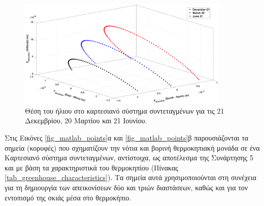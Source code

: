 \documentclass[12pt, a4paper]{report} %
\begin{document}
\begin{figure}[ht]%
    \centering
    \includegraphics[width=0.9\textwidth]{Figures/sun_pos.jpg}
    \caption{Θέση του ήλιου στο καρτεσιανό σύστημα συντεταγμένων για τις 21 Δεκεμβρίου, 20 Μαρτίου και 21 Ιουνίου.}
    \label{fig_sun_pos}
\end{figure}

Στις Εικόνες \ref{fig_matlab_points}α και \ref{fig_matlab_points}β παρουσιάζονται τα σημεία (κορυφές) που σχηματίζουν την νότια 
και βορινή θερμοκηπιακή μονάδα σε ένα Καρτεσιανό σύστημα συντεταγμένων, αντίστοιχα, ως αποτέλεσμα της Συνάρτησης 5 και με βάση 
τα χαρακτηριστικά του θερμοκηπίου (Πίνακας \ref{tab_greenhouse_characteristics}). Τα σημεία αυτά χρησιμοποιούνται στη συνέχεια 
για τη δημιουργία των απεικονίσεων δύο και τριών διαστάσεων, καθώς και για τον εντοπισμό της σκιάς μέσα στο θερμοκήπιο.
\end{document}
